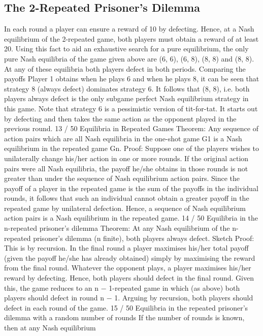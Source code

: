 \documentclass[]{report}
\begin{document}
\subsection{The 2-Repeated Prisoner’s Dilemma}
In each round a player can ensure a reward of 10 by defecting.
Hence, at a Nash equilibrium of the 2-repeated game, both players
must obtain a reward of at least 20.
Using this fact to aid an exhaustive search for a pure equilibrium,
the only pure Nash equilibria of the game given above are (6, 6),
(6, 8), (8, 8) and (8, 8). At any of these equilibria both players
defect in both periods.
Comparing the payoffs Player 1 obtains when he plays 6 and when
he plays 8, it can be seen that strategy 8 (always defect) dominates
strategy 6. It follows that (8, 8), i.e. both players always defect is
the only subgame perfect Nash equilibrium strategy in this game.
Note that strategy 6 is a pessimistic version of tit-for-tat. It starts
out by defecting and then takes the same action as the opponent
played in the previous round.
13 / 50
Equilibria in Repeated Games
Theorem: Any sequence of action pairs which are all Nash
equilibria in the one-shot game G1 is a Nash equilibrium in the
repeated game Gn.
Proof: Suppose one of the players wishes to unilaterally change
his/her action in one or more rounds.
If the original action pairs were all Nash equilibria, the payoff
he/she obtains in those rounds is not greater than under the
sequence of Nash equilibrium action pairs.
Since the payoff of a player in the repeated game is the sum of the
payoffs in the individual rounds, it follows that such an individual
cannot obtain a greater payoff in the repeated game by unilateral
defection. Hence, a sequence of Nash equilibrium action pairs is a
Nash equilibrium in the repeated game.
14 / 50
Equilibria in the n-repeated prisoner’s dilemma
Theorem: At any Nash equilibrium of the n-repeated prisoner’s
dilemma (n finite), both players always defect.
Sketch Proof: This is by recursion. In the final round a player
maximises his/her total payoff (given the payoff he/she has already
obtained) simply by maximising the reward from the final round.
Whatever the opponent plays, a player maximises his/her reward
by defecting. Hence, both players should defect in the final round.
Given this, the game reduces to an n − 1-repeated game in which
(as above) both players should defect in round n − 1. Arguing by
recursion, both players should defect in each round of the game.
15 / 50
Equilibria in the repeated prisoner’s dilemma with a
random number of rounds
If the number of rounds is known, then at any Nash equilibrium
\end{document}
